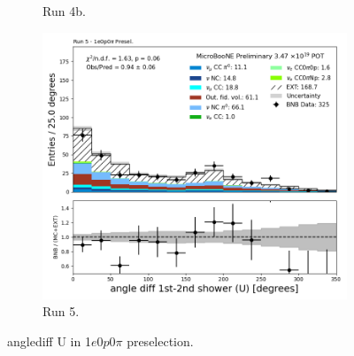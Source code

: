 \begin{figure}[H]
\begin{subfigure}[t]{0.32\linewidth}
        \caption{Run 4b.}
    \end{subfigure}%
    \hspace{0.2cm}%
    \begin{subfigure}[t]{0.32\linewidth}
        \includegraphics[width=\linewidth]{technote/Appendix_Preselection/Figures/1e0p0pi/Run5/anglediff_U_Run5_1e0p0pi_Presel.png}
        \caption{Run 5.}
    \end{subfigure}
    \caption{anglediff U in 1$e$0$p$0$\pi$ preselection.}
\end{figure}


